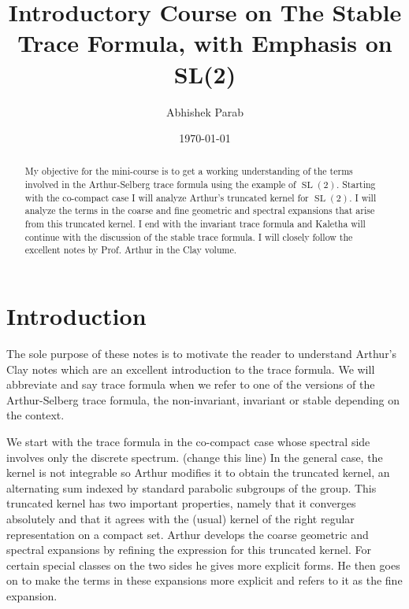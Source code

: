 \documentclass[11pt]{amsart}
\def\sl{\operatorname{SL}}
\theoremstyle{remark}
\begin{document}
\title{Introductory Course on The Stable Trace Formula, with Emphasis on SL(2)}
\author{Abhishek Parab}
\date{\today}                       %

\maketitle
\setcounter{tocdepth}{1}		%

\begin{abstract}
	My objective for the mini-course is to get a working understanding of the terms involved in the Arthur-Selberg trace formula using the example of $\sl(2)$. Starting with the co-compact case I will analyze Arthur's truncated kernel for $\sl(2)$. I will analyze the terms in the coarse and fine geometric and spectral expansions that arise from this truncated kernel. I end with the invariant trace formula and Kaletha will continue with the discussion of the stable trace formula. I will closely follow the excellent notes by Prof. Arthur in the Clay volume. 
\end{abstract}

\tableofcontents


\section{Introduction} \label{sec_intro}
	
	The sole purpose of these notes is to motivate the reader to understand Arthur's Clay notes \cite{clay} which are an excellent introduction to the trace formula. We will abbreviate and say trace formula when we refer to one of the versions of the Arthur-Selberg trace formula, the non-invariant, invariant or stable depending on the context. 
	
	We start with the trace formula in the co-compact case whose spectral side involves only the discrete spectrum. (change this line) In the general case, the kernel is not integrable so Arthur modifies it to obtain the truncated kernel, an alternating sum indexed by standard parabolic subgroups of the group. This truncated kernel has two important properties, namely that it converges absolutely and that it agrees with the (usual) kernel of the right regular representation on a compact set. Arthur develops the coarse geometric and spectral expansions by refining the expression for this truncated kernel. For certain special classes on the two sides he gives more explicit forms. He then goes on to make the terms in these expansions more explicit and refers to it as the fine expansion. 
	
\end{document}
